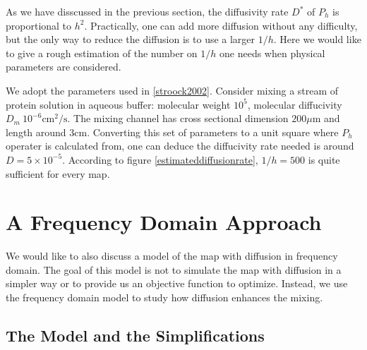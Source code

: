 As we have disscussed in the previous section, the diffusivity rate $D^*$ of $P_h$ is
proportional to $h^2$. Practically, one can add more diffusion without any difficulty,
but the only way to reduce the diffusion is to use a larger $1/h$. Here we would like to give a
rough estimation of the number on $1/h$ one needs when physical parameters are considered.

We adopt the parameters used in \ref{stroock2002}. Consider mixing a stream of protein
solution in aqueous buffer: molecular weight $10^5$, molecular diffucivity
$D_m~10^{-6} \text{cm}^2/\text{s}$. The mixing channel has cross sectional dimension
$200\mu \text{m}$ and length around $3\text{cm}$. Converting this set of parameters to a unit
square where $P_h$ operater is calculated from, one can deduce the diffucivity rate needed is
around $D =5 \times 10^{-5}$. According to figure \ref{estimateddiffusionrate}, $1/h=500$ is quite
sufficient for every map.



\section{A Frequency Domain Approach}
\label{A Frequency Domain Approach}

We would like to also discuss a model of the map with diffusion in
frequency domain. The goal of this model is not to simulate the map
with diffusion in a simpler way or to provide us an objective
function to optimize. Instead, we use the frequency domain model to
study how diffusion enhances the mixing.


\subsection{The Model and the Simplifications}

